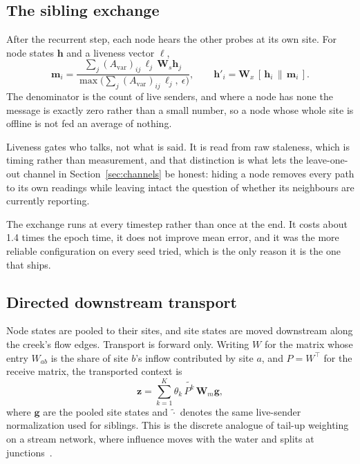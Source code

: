 \documentclass{article}
\begin{document}
\subsection{The sibling exchange}
\label{sec:siblings}

After the recurrent step, each node hears the other probes at its own site. For
node states $\bm{h}$ and a liveness vector $\ell$,
\begin{equation}
  \bm{m}_{i} = \frac{\sum_{j} (A_{\mathrm{var}})_{ij}\, \ell_{j}\, \bm{W}_{\!s} \bm{h}_{j}}
                    {\max\big(\sum_{j} (A_{\mathrm{var}})_{ij}\, \ell_{j},\ \epsilon\big)},
  \qquad
  \bm{h}'_{i} = \bm{W}_{\!x}\,[\,\bm{h}_{i} \,\|\, \bm{m}_{i}\,].
\end{equation}
The denominator is the count of live senders, and where a node has none the
message is exactly zero rather than a small number, so a node whose whole site
is offline is not fed an average of nothing.

Liveness gates who talks, not what is said. It is read from raw staleness,
which is timing rather than measurement, and that distinction is what lets the
leave-one-out channel in Section~\ref{sec:channels} be honest: hiding a node
removes every path to its own readings while leaving intact the question of
whether its neighbours are currently reporting.

The exchange runs at every timestep rather than once at the end. It costs about
1.4 times the epoch time, it does not improve mean error, and it was the more
reliable configuration on every seed tried, which is the only reason it is the
one that ships.

\subsection{Directed downstream transport}
\label{sec:tailup}

Node states are pooled to their sites, and site states are moved downstream
along the creek's flow edges. Transport is forward only. Writing $W$ for the
matrix whose entry $W_{ab}$ is the share of site $b$'s inflow contributed by
site $a$, and $P = W^{\top}$ for the receive matrix, the transported context is
\begin{equation}
  \bm{z} = \sum_{k=1}^{K} \theta_{k} \, \widetilde{P^{k}} \, \bm{W}_{\!m} \bm{g},
\end{equation}
where $\bm{g}$ are the pooled site states and $\widetilde{\cdot}$ denotes the
same live-sender normalization used for siblings. This is the discrete analogue
of tail-up weighting on a stream network, where influence moves with the water
and splits at junctions~\citep{verhoef2010tailup}.
\end{document}
